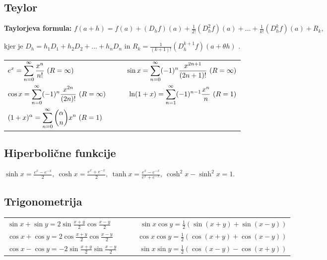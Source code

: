 \subsection{Teylor}
\textbf{Taylorjeva formula:} $\displaystyle f(a+h) = f(a) + (D_hf)(a) + \frac{1}{2!}(D_h^2f)(a) + \ldots + \frac{1}{k!} (D_h^kf)(a) + R_k$,

kjer je $D_h = h_1D_1 + h_2D_2 + \ldots + h_nD_n$  in $R_k = \frac{1}{(k+1)!} (D_h^{k+1}f)(a + \theta h)$ .
\begin{center}
    \begin{tabular}{ l r }
     \(\displaystyle e^x = \sum_{n=0}^{\infty} \frac{x^n}{n!} \ (R=\infty)\) & \(\ds \qquad \sin x = \sum_{n=0}^{\infty}(-1)^n \frac{x^{2n+1}}{(2n+1)!} \ (R=\infty)\) \\
     \(\ds \cos x = \sum_{n=0}^{\infty} (-1)^n \frac{x^{2n}}{(2n)!} \ (R=\infty)\) & \(\qquad \displaystyle \ln (1+x) = \sum_{n=1}^{\infty}(-1)^{n-1}\frac{x^n}{n} \ (R=1)\) \\
     \(\ds (1+x)^\alpha = \sum_{n=0}^{\infty}\binom{\alpha}{n}x^n \ (R=1)\)
    \end{tabular}
\end{center}

\subsection{Hiperbolične funkcije}
\(\displaystyle \sinh x = \frac{e^x - e^{-x}}{2}, \ \cosh x = \frac{e^x + e^{-x}}{2}, \ \tanh x = \frac{e^x - e^{-x}}{e^x + e^{-x}}, \ \cosh^2 x - \sinh^2 x = 1\).

\subsection{Trigonometrija}
\begin{center}
    \begin{tabular}{ l r }
     \(\sin x + \sin y = 2 \sin \frac{x+y}{2} \cos \frac{x-y}{2}\) & \(\qquad \sin x \cos y = \frac{1}{2}\left(\sin(x+y) + \sin (x-y)\right)\) \\ [0.5ex]
     \(\cos x + \cos y = 2 \cos \frac{x+y}{2} \cos \frac{x-y}{2}\) & \(\qquad \cos x \cos y = \frac{1}{2}\left(\cos(x+y) + \cos (x-y)\right)\) \\ [0.5ex]
     \(\cos x - \cos y = -2 \sin \frac{x+y}{2} \sin \frac{x-y}{2}\) & \(\qquad \sin x \sin y = \frac{1}{2}\left(\cos(x-y) - \cos (x+y)\right)\)
    \end{tabular}
\end{center}

